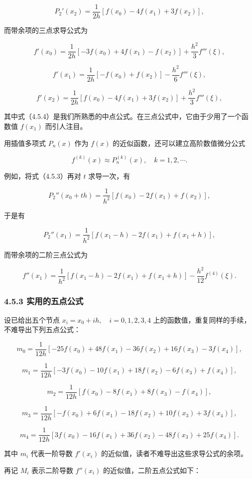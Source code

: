 \documentclass[
  10pt,
  fontset=fandol]{ctexart}
\begin{document}
\[
P_2'(x_2)=\frac1{2h}[f(x_0)-4f(x_1)+3f(x_2)],
\]

而带余项的三点求导公式为

\[
f'(x_0)=\frac1{2h}[-3f(x_0)+4f(x_1)-f(x_2)]+\frac{h^2}3f'''(\xi),
\]

\[
f'(x_1)=\frac1{2h}[-f(x_0)+f(x_2)]-\frac{h^2}6f'''(\xi),
\tag{4.5.4}
\]

\[
f'(x_2)=\frac1{2h}[f(x_0)-4f(x_1)+3f(x_2)]+\frac{h^2}3f'''(\xi),
\]

其中式（4.5.4）是我们所熟悉的中点公式。在三点公式中，它由于少用了一个函数值 \(f(x_1)\) 而引人注目。

用插值多项式 \(P_n(x)\) 作为 \(f(x)\) 的近似函数，还可以建立高阶数值微分公式

\[
f^{(k)}(x)\approx P_n^{(k)}(x),\quad k=1,2,\cdots.
\]

例如，将式（4.5.3）再对 \(t\) 求导一次，有

\[
P_2''(x_0+th)=\frac1{h^2}[f(x_0)-2f(x_1)+f(x_2)],
\]

于是有

\[
P_2''(x_1)=\frac1{h^2}[f(x_1-h)-2f(x_1)+f(x_1+h)],
\]

而带余项的二阶三点公式为

\[
f''(x_1)=\frac1{h^2}[f(x_1-h)-2f(x_1)+f(x_1+h)]-\frac{h^2}{12}f^{(4)}(\xi).
\tag{4.5.5}
\]

\subsubsection{4.5.3 实用的五点公式}\label{ux5b9eux7528ux7684ux4e94ux70b9ux516cux5f0f}

设已给出五个节点 \(x_i=x_0+ih,\allowbreak \quad i=0,\allowbreak 1,\allowbreak 2,\allowbreak 3,\allowbreak 4\) 上的函数值，重复同样的手续，不难导出下列五点公式：

\[
m_0=\frac1{12h}[-25f(x_0)+48f(x_1)-36f(x_2)+16f(x_3)-3f(x_4)],
\]

\[
m_1=\frac1{12h}[-3f(x_0)-10f(x_1)+18f(x_2)-6f(x_3)+f(x_4)],
\]

\[
m_2=\frac1{12h}[f(x_0)-8f(x_1)+8f(x_3)-f(x_4)],
\]

\[
m_3=\frac1{12h}[-f(x_0)+6f(x_1)-18f(x_2)+10f(x_3)+3f(x_4)],
\]

\[
m_4=\frac1{12h}[3f(x_0)-16f(x_1)+36f(x_2)-48f(x_3)+25f(x_4)].
\]

其中 \(m_i\) 代表一阶导数 \(f'(x_i)\) 的近似值，读者不难导出这些求导公式的余项。

再记 \(M_i\) 表示二阶导数 \(f''(x_i)\) 的近似值，二阶五点公式如下：
\end{document}
